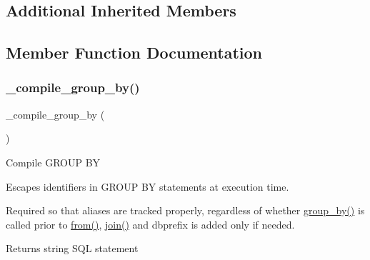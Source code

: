 \subsection*{Additional Inherited Members}


\subsection{Member Function Documentation}
\mbox{\label{class_c_i___d_b__query__builder_a953e760f382d7187dc5d7b238a7ff439}} 
\subsubsection{\texorpdfstring{\+\_\+compile\+\_\+group\+\_\+by()}{\_compile\_group\_by()}}
{\footnotesize\ttfamily \+\_\+compile\+\_\+group\+\_\+by (\begin{DoxyParamCaption}{ }\end{DoxyParamCaption})\hspace{0.3cm}{\ttfamily [protected]}}

Compile G\+R\+O\+UP BY

Escapes identifiers in G\+R\+O\+UP BY statements at execution time.

Required so that aliases are tracked properly, regardless of whether \mbox{\hyperlink{class_c_i___d_b__query__builder_a111cc822f85357c4cfe37886e6315dce}{group\+\_\+by()}} is called prior to \mbox{\hyperlink{class_c_i___d_b__query__builder_a91f5f004ed8e2237a4decc5d23ac3457}{from()}}, \mbox{\hyperlink{class_c_i___d_b__query__builder_a54557b1ef757507cbbd2a8802a99810b}{join()}} and dbprefix is added only if needed.

\begin{DoxyReturn}{Returns}
string S\+QL statement 
\end{DoxyReturn}
\mbox{\label{class_c_i___d_b__query__builder_a78ef026e2ca49e2b371f9cc577f6e777}} 
